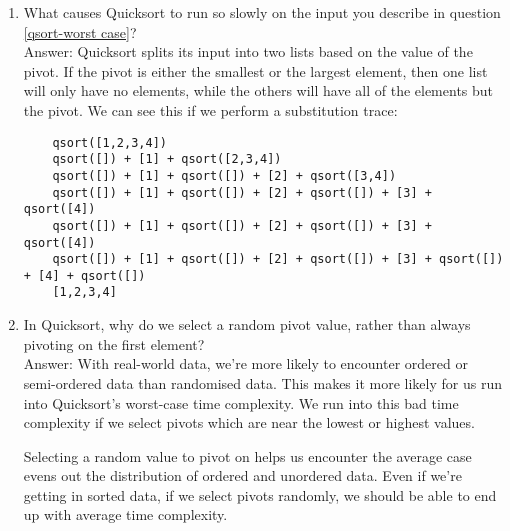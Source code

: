 \documentclass[11pt]{article}
\newenvironment{answer}{\large\lstset{basicstyle=\large}\color{white} \small{Answer:}\large}{}
\newenvironment{answer}{\large\lstset{basicstyle=\large}\color{red} \small{Answer:}\large}{}
\begin{document}
\begin{enumerate}
\item What causes Quicksort to run so slowly on the input you describe in question \ref{qsort-worst case}? \\
\begin{answer}
Quicksort splits its input into two lists based on the value of the pivot.  If the pivot is either the smallest or the largest element, then one list will only have no elements, while the others will have all of the elements but the pivot. We can see this if we perform a substitution trace:
	\begin{verbatim}
	qsort([1,2,3,4])
	qsort([]) + [1] + qsort([2,3,4])
	qsort([]) + [1] + qsort([]) + [2] + qsort([3,4])
	qsort([]) + [1] + qsort([]) + [2] + qsort([]) + [3] + qsort([4])
	qsort([]) + [1] + qsort([]) + [2] + qsort([]) + [3] + qsort([4])
	qsort([]) + [1] + qsort([]) + [2] + qsort([]) + [3] + qsort([]) + [4] + qsort([])
	[1,2,3,4]
	\end{verbatim}
\end{answer}



\item In Quicksort, why do we select a random pivot value, rather than always pivoting on the first element? \\
\begin{answer}
With real-world data, we're more likely to encounter ordered or semi-ordered data than randomised data. This makes it more likely for us run into Quicksort's worst-case time complexity. We run into this bad time complexity if we select pivots which are near the lowest or highest values.

Selecting a random value to pivot on helps us encounter the average case evens out the distribution of ordered and unordered data. Even if we're getting in sorted data, if we select pivots randomly, we should be able to end up with average time complexity.
\end{answer}


\pagebreak



\end{enumerate}
\end{document}
